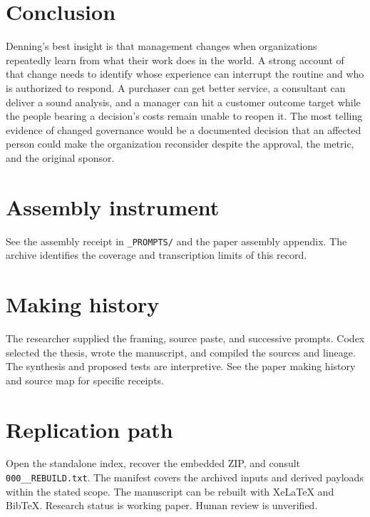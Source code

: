 \documentclass[11pt]{article}
\begin{document}
\section{Conclusion}
Denning's best insight is that management changes when organizations repeatedly learn from what their work does in the world. A strong account of that change needs to identify whose experience can interrupt the routine and who is authorized to respond. A purchaser can get better service, a consultant can deliver a sound analysis, and a manager can hit a customer outcome target while the people bearing a decision's costs remain unable to reopen it. The most telling evidence of changed governance would be a documented decision that an affected person could make the organization reconsider despite the approval, the metric, and the original sponsor.




\appendix
\section{Assembly instrument}
See the assembly receipt in \texttt{\_PROMPTS/} and the paper assembly appendix. The archive identifies the coverage and transcription limits of this record.
\section{Making history}
The researcher supplied the framing, source paste, and successive prompts. Codex selected the thesis, wrote the manuscript, and compiled the sources and lineage. The synthesis and proposed tests are interpretive. See the paper making history and source map for specific receipts.
\section{Replication path}
Open the standalone index, recover the embedded ZIP, and consult \texttt{000\_\_REBUILD.txt}. The manifest covers the archived inputs and derived payloads within the stated scope. The manuscript can be rebuilt with XeLaTeX and BibTeX. Research status is working paper. Human review is unverified.
\end{document}
